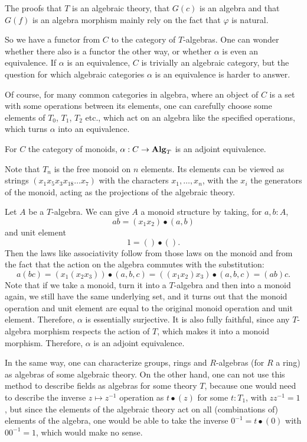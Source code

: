 The proofs that $ T $ is an algebraic theory, that $ G(c) $ is an algebra and that $ G(f) $ is an algebra morphism mainly rely on the fact that $ \varphi $ is natural.

So we have a functor from $ C $ to the category of $ T $-algebras. One can wonder whether there also is a functor the other way, or whether $ \alpha $ is even an equivalence. If $ \alpha $ is an equivalence, $ C $ is trivially an algebraic category, but the question for which algebraic categories $ \alpha $ is an equivalence is harder to answer.

Of course, for many common categories in algebra, where an object of $ C $ is a set with some operations between its elements, one can carefully choose some elements of $ T_0 $, $ T_1 $, $ T_2 $ etc., which act on an algebra like the specified operations, which turns $ \alpha $ into an equivalence.

\begin{example}\label{ex:free-monoid-theory}
  For $ C $ the category of monoids, $ \alpha: C \to \mathbf{Alg}_{T} $ is an adjoint equivalence.

  Note that $ T_n $ is the free monoid on $ n $ elements. Its elements can be viewed as strings $ (x_1 x_5 x_3 x_{18} \dots x_7) $ with the characters $ x_1, \dots, x_n $, with the $ x_i $ the generators of the monoid, acting as the projections of the algebraic theory.

  Let $ A $ be a $ T $-algebra. We can give $ A $ a monoid structure by taking, for $ a, b: A $,
  \[ a b = (x_1 x_2) \bullet (a, b) \]
  and unit element
  \[ 1 = () \bullet (). \]
  Then the laws like associativity follow from those laws on the monoid and from the fact that the action on the algebra commutes with the substitution:
  \[ a (b c) = (x_1 (x_2 x_3)) \bullet (a, b, c) = ((x_1 x_2) x_3) \bullet (a, b, c) = (a b) c. \]
  Note that if we take a monoid, turn it into a $ T $-algebra and then into a monoid again, we still have the same underlying set, and it turns out that the monoid operation and unit element are equal to the original monoid operation and unit element. Therefore, $ \alpha $ is essentially surjective. It is also fully faithful, since any $ T $-algebra morphism respects the action of $ T $, which makes it into a monoid morphism. Therefore, $ \alpha $ is an adjoint equivalence.
\end{example}

\begin{remark}
  In the same way, one can characterize groups, rings and $ R $-algebras (for $ R $ a ring) as algebras of some algebraic theory. On the other hand, one can not use this method to describe fields as algebras for some theory $ T $, because one would need to describe the inverse $ z \mapsto z^{-1} $ operation as $ t \bullet (z) $ for some $ t: T_1 $, with $ z z^{-1} = 1 $, but since the elements of the algebraic theory act on all (combinations of) elements of the algebra, one would be able to take the inverse $ 0^{-1} = t \bullet (0) $ with $ 0 0^{-1} = 1 $, which would make no sense.
\end{remark}

